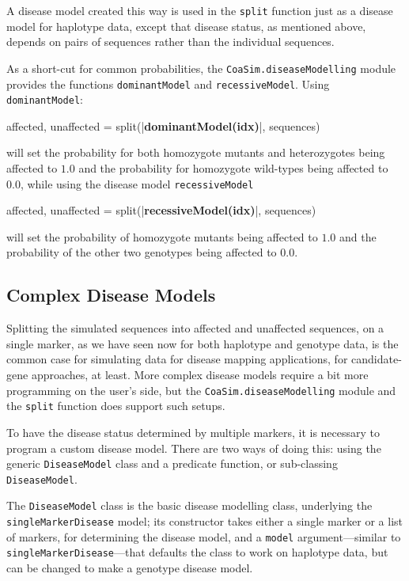 \documentclass{manual}
\begin{document}
\begin{empfile}
A disease model created this way is used in the \texttt{split}
function just as a disease model for haplotype data, except that
disease status, as mentioned above, depends on pairs of sequences
rather than the individual sequences.

As a short-cut for common probabilities, the
\texttt{CoaSim.diseaseModelling} module provides the functions
\texttt{dominantModel} and \texttt{recessiveModel}.  Using
\texttt{dominantModel}:
\begin{code}
affected, unaffected = split(|\textbf{dominantModel(idx)}|, sequences)
\end{code}
will set the probability for both homozygote mutants and heterozygotes
being affected to $1.0$ and the probability for homozygote wild-types being
affected to $0.0$, while using the disease model \texttt{recessiveModel}
\begin{code}
affected, unaffected = split(|\textbf{recessiveModel(idx)}|, sequences)
\end{code}
will set the probability of homozygote mutants being affected to $1.0$ and
the probability of the other two genotypes being affected to $0.0$.



\subsection{Complex Disease Models}
\label{sec:compl-dise-models}
 
Splitting the simulated sequences into affected and unaffected
sequences, on a single marker, as we have seen now for both haplotype
and genotype data, is the common case for simulating data for disease
mapping applications, for candidate-gene approaches, at least.  More
complex disease models require a bit more programming on the user's
side, but the \texttt{CoaSim.diseaseModelling} module and the
\texttt{split} function does support such setups.

To have the disease status determined by multiple markers, it is
necessary to program a custom disease model.  There are two ways of
doing this: using the generic \texttt{DiseaseModel} class and a
predicate function, or sub-classing \texttt{DiseaseModel}.

The \texttt{DiseaseModel} class is the basic disease modelling class,
underlying the \texttt{singleMarkerDisease} model; its constructor
takes either a single marker or a list of markers, for determining the
disease model, and a \texttt{model} argument---similar to
\texttt{singleMarkerDisease}---that defaults the class to work on
haplotype data, but can be changed to make a genotype disease model.


\end{empfile}
\end{document}
